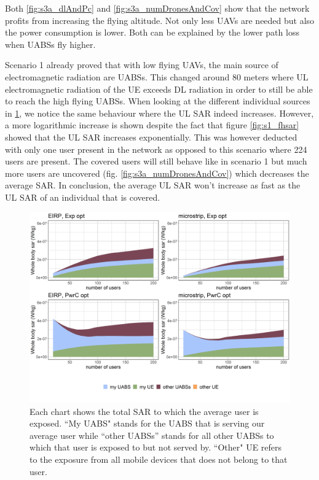 Both  \ref{fig:s3a_dlAndPc} and \ref{fig:s3a_numDronesAndCov} show that the network profits from increasing the flying altitude. 
Not only less \gls{UAV}s are needed but also the power consumption is lower. Both can be explained by the lower path loss when \gls{UABS}s fly higher.

Scenario 1 already proved that with low flying \gls{UAV}s, the main source of electromagnetic radiation are \gls{UABS}s. 
This changed around 80 meters where \gls{UL} electromagnetic radiation of the \gls{UE}
exceeds \gls{DL} radiation in order to still be able to reach the high flying \gls{UABS}s. 
When looking at the different individual sources in \ref{fig:s3a_fourSourcesMatrix}, we notice the same behaviour where the 
 \gls{UL} \gls{SAR} indeed increases. However, a more logarithmic increase is shown
  despite the fact that figure \ref{fig:s1_fhsar} showed that the  \gls{UL} \gls{SAR} 
increases exponentially. This was however deducted with only one user present in the network as opposed to this scenario 
where 224 users are present. The covered users will still behave like in scenario 1 but much more users are uncovered (fig. \ref{fig:s3a_numDronesAndCov}) 
which decreases the average \gls{SAR}. 
In conclusion, the average  \gls{UL} \gls{SAR}  won't increase as fast as the \gls{UL} \gls{SAR} of 
an individual that is covered.

\begin{figure}[]
  \includegraphics[width=\textwidth]{../results/s3/fhFourSources.png}
  \caption{Each chart shows the total SAR to which the average user is exposed. ``My UABS" stands for the UABS that is serving our average user while ``other UABSs'' stands for 
  all other UABSs to which that user is exposed to but not served by. ``Other" UE refers to the exposure from all mobile devices that does not belong to that user.}
  \label{fig:s3a_fourSourcesMatrix}
\end{figure}

